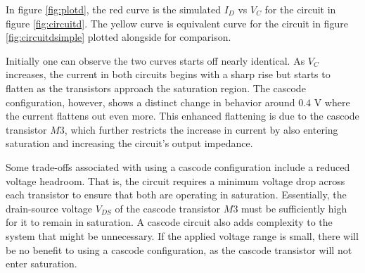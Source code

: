 \documentclass[onecolumn]{article}
\begin{document}
In figure \ref{fig:plotd}, the red curve is the simulated $I_D$ vs $V_{C}$ for the circuit in figure \ref{fig:circuitd}. The yellow curve is equivalent curve for the circuit in figure \ref{fig:circuitdsimple} plotted alongside for comparison.  

Initially one can observe the two curves starts off nearly identical. As $V_{C}$ increases, the current in both circuits begins with a sharp rise but starts to flatten as the transistors approach the saturation region. The cascode configuration, however, shows a distinct change in behavior around $0.4$ V where the current flattens out even more. This enhanced flattening is due to the cascode transistor $M3$, which further restricts the increase in current by also entering saturation and increasing the circuit's output impedance.

Some trade-offs associated with using a cascode configuration include a reduced voltage headroom. That is, the circuit requires a minimum voltage drop across each transistor to ensure that both are operating in saturation. Essentially, the drain-source voltage $V_{DS}$ of the cascode transistor $M3$ must be sufficiently high for it to remain in saturation. A cascode circuit also adds complexity to the system that might be unnecessary. If the applied voltage range is small, there will be no benefit to using a cascode configuration, as the cascode transistor will not enter saturation.
\end{document}

